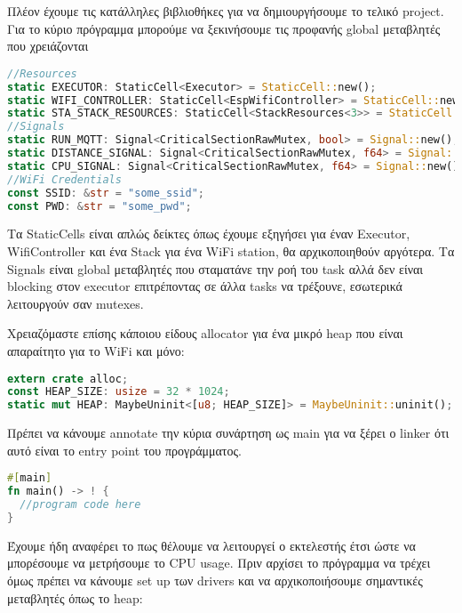 Πλέον έχουμε τις κατάλληλες βιβλιοθήκες για να δημιουργήσουμε το
τελικό project. Για το κύριο πρόγραμμα μπορούμε να ξεκινήσουμε τις
προφανής global μεταβλητές που χρειάζονται

\begin{lstlisting}[language=Rust]
//Resources
static EXECUTOR: StaticCell<Executor> = StaticCell::new();
static WIFI_CONTROLLER: StaticCell<EspWifiController> = StaticCell::new();
static STA_STACK_RESOURCES: StaticCell<StackResources<3>> = StaticCell::new();
//Signals
static RUN_MQTT: Signal<CriticalSectionRawMutex, bool> = Signal::new();
static DISTANCE_SIGNAL: Signal<CriticalSectionRawMutex, f64> = Signal::new();
static CPU_SIGNAL: Signal<CriticalSectionRawMutex, f64> = Signal::new();
//WiFi Credentials
const SSID: &str = "some_ssid";
const PWD: &str = "some_pwd";
\end{lstlisting}

Τα StaticCells είναι απλώς δείκτες όπως έχουμε εξηγήσει για έναν Executor, WifiController και
ένα Stack για ένα WiFi station, θα αρχικοποιηθούν αργότερα. Τα Signals είναι global μεταβλητές
που σταματάνε την ροή του task αλλά δεν είναι blocking στον executor επιτρέποντας σε άλλα tasks
να τρέξουνε, εσωτερικά λειτουργούν σαν mutexes.

Χρειαζόμαστε επίσης κάποιου είδους allocator για ένα μικρό heap που είναι απαραίτητο για το WiFi και μόνο:

\begin{lstlisting}[language=Rust]
extern crate alloc;
const HEAP_SIZE: usize = 32 * 1024;
static mut HEAP: MaybeUninit<[u8; HEAP_SIZE]> = MaybeUninit::uninit();
\end{lstlisting}

Πρέπει να κάνουμε annotate την κύρια συνάρτηση ως main για να ξέρει
ο linker ότι αυτό είναι το entry point του προγράμματος.

\begin{lstlisting}[language=Rust]
#[main]
fn main() -> ! {
  //program code here
}
\end{lstlisting}

Έχουμε ήδη αναφέρει το πως θέλουμε να λειτουργεί ο εκτελεστής έτσι
ώστε να μπορέσουμε να μετρήσουμε το CPU usage. Πριν αρχίσει το
πρόγραμμα να τρέχει όμως πρέπει να κάνουμε set up των drivers και
να αρχικοποιήσουμε σημαντικές μεταβλητές όπως το heap:

